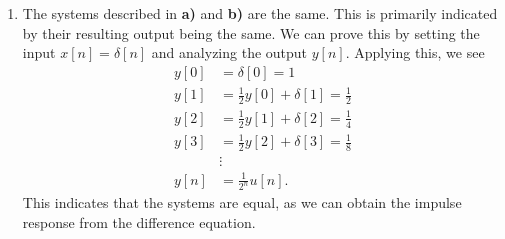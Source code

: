 \documentclass[12pt]{article}
\begin{document}
\begin{enumerate}[label=\textbf{\alph*)}, leftmargin=2.6em]
\begin{Verbatim}[frame=single, commandchars=\\\{\}]
>> y_step = conv(x, h);
>> y_step = y_step(1:101); \textcolor{Green}{% length match}
 
>> \textcolor{blue}{stem}(n, y_step, \textcolor{violet}{'.'});
>> \textcolor{blue}{title}(\textcolor{violet}{'step response h[n]'}, \textcolor{violet}{'FontSize'}, 16);
>> \textcolor{blue}{xlabel}(\textcolor{violet}{'n'}, \textcolor{violet}{'FontSize'}, 14);
>> \textcolor{blue}{ylabel}(\textcolor{violet}{'y[n]'}, \textcolor{violet}{'FontSize'}, 14);
\end{Verbatim}

\item The systems described in \textbf{a)} and \textbf{b)} are the same. This is primarily indicated by their resulting output being the same. We can prove this by setting the input $x[n] = \delta[n]$ and analyzing the output $y[n]$. Applying this, we see
\[
\begin{aligned}
y[0] &= \delta[0] = 1 \\
y[1] &= \frac{1}{2}y[0] + \delta[1] = \frac{1}{2} \\
y[2] &= \frac{1}{2}y[1] + \delta[2] = \frac{1}{4} \\
y[3] &= \frac{1}{2}y[2] + \delta[3] = \frac{1}{8} \\
&\vdots \\
y[n] &= \frac{1}{2^n}u[n].
\end{aligned}
\]
This indicates that the systems are equal, as we can obtain the impulse response from the difference equation.
\end{enumerate}
\end{document}
